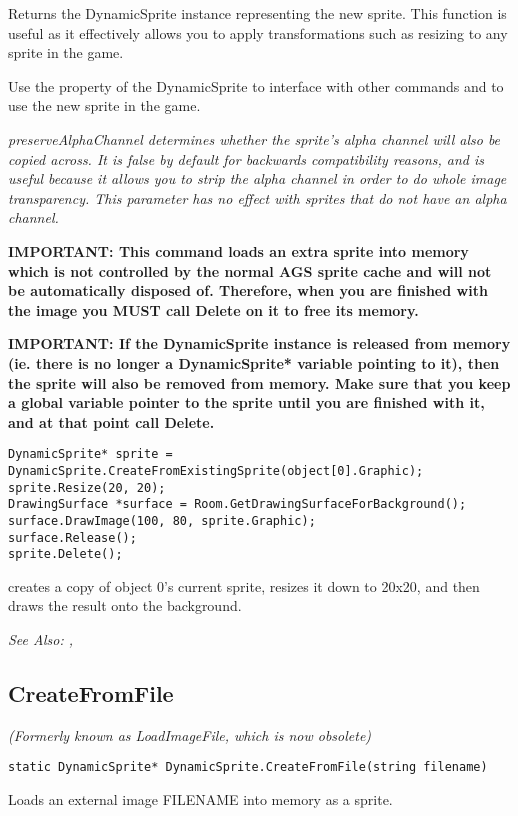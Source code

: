 Returns the DynamicSprite instance representing the new sprite. This function
is useful as it effectively allows you to apply transformations such as resizing to
any sprite in the game.

Use the  property of the DynamicSprite to
interface with other commands and to use the new sprite in the game.

\it{preserveAlphaChannel} determines whether the sprite's alpha channel will also
be copied across. It is false by default for backwards compatibility reasons, and
is useful because it allows you to strip the alpha channel in order to do whole image
transparency. This parameter has no effect with sprites that do not have an alpha
channel.

\bf{IMPORTANT:} This command loads an extra sprite into memory which is not controlled
by the normal AGS sprite cache and will not be automatically disposed of. Therefore, when
you are finished with the image you \bf{MUST} call Delete on it to free its memory.

\bf{IMPORTANT:} If the DynamicSprite instance is released from memory (ie. there is
no longer a DynamicSprite* variable pointing to it), then the sprite will also be
removed from memory. Make sure that you keep a global variable pointer to the sprite
until you are finished with it, and at that point call Delete.

\begin{verbatim}
DynamicSprite* sprite = DynamicSprite.CreateFromExistingSprite(object[0].Graphic);
sprite.Resize(20, 20);
DrawingSurface *surface = Room.GetDrawingSurfaceForBackground();
surface.DrawImage(100, 80, sprite.Graphic);
surface.Release();
sprite.Delete();
\end{verbatim}
creates a copy of object 0's current sprite, resizes it down to 20x20, and then draws
the result onto the background.

\it{See Also:} ,


\subsection{CreateFromFile}\label{DynamicSprite.CreateFromFile}%

\it{(Formerly known as LoadImageFile, which is now obsolete)}

\begin{verbatim}
static DynamicSprite* DynamicSprite.CreateFromFile(string filename)
\end{verbatim}
Loads an external image FILENAME into memory as a sprite.

